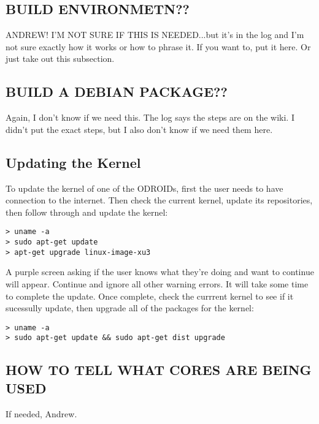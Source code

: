 \subsection{BUILD ENVIRONMETN??}
ANDREW! I'M NOT SURE IF THIS IS NEEDED...but it's in the log and I'm not sure exactly how it works or how to phrase it. If you want to, put it here. Or just take out this subsection.

\subsection{BUILD A DEBIAN PACKAGE??}
Again, I don't know if we need this. The log says the steps are on the wiki. I didn't put the exact steps, but I also don't know if we need them here.

\subsection{Updating the Kernel}
To update the kernel of one of the ODROIDs, first the user needs to have connection to the internet. Then check the current kernel, update its repositories, then follow through and update the kernel:
\begin{lstlisting}
> uname -a
> sudo apt-get update
> apt-get upgrade linux-image-xu3
\end{lstlisting}
A purple screen asking if the user knows what they're doing and want to continue will appear. Continue and ignore all other warning errors. It will take some time to complete the update. Once complete, check the currrent kernel to see if it sucessully update, then upgrade all of the packages for the kernel:
\begin{lstlisting}
> uname -a
> sudo apt-get update && sudo apt-get dist upgrade
\end{lstlisting}

\subsection{HOW TO TELL WHAT CORES ARE BEING USED}
If needed, Andrew.